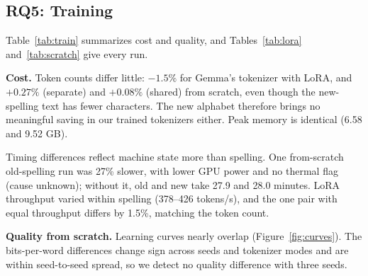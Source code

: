 \subsection{RQ5: Training}
Table~\ref{tab:train} summarizes cost and quality, and Tables~\ref{tab:lora} and~\ref{tab:scratch} give every run.

\begin{table}[t]
\centering\small
\setlength{\tabcolsep}{3pt}
\caption{Training on old vs.\ new spelling: mean $\pm$ SD over three seeds. Bits per word on validation text in the same spelling.}
\label{tab:train}
\end{table}

\textbf{Cost.} Token counts differ little: $-1.5\%$ for Gemma's tokenizer with LoRA, and $+0.27\%$ (separate) and $+0.08\%$ (shared) from scratch, even though the new-spelling text has fewer characters. The new alphabet therefore brings no meaningful saving in our trained tokenizers either. Peak memory is identical (6.58 and 9.52 GB).

Timing differences reflect machine state more than spelling. One from-scratch old-spelling run was 27\% slower, with lower GPU power and no thermal flag (cause unknown); without it, old and new take 27.9 and 28.0 minutes. LoRA throughput varied within spelling (378--426 tokens/s), and the one pair with equal throughput differs by 1.5\%, matching the token count.

\textbf{Quality from scratch.} Learning curves nearly overlap (Figure~\ref{fig:curves}). The bits-per-word differences change sign across seeds and tokenizer modes and are within seed-to-seed spread, so we detect no quality difference with three seeds.

